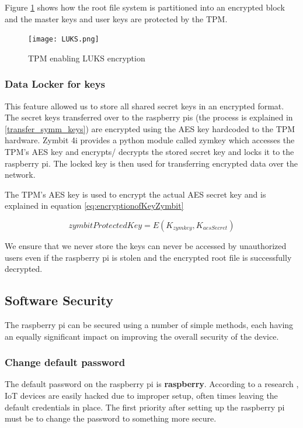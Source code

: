 \documentclass[11pt,openright]{report}
\begin{document}
Figure \ref{fig:tpmenableluks} shows how the root file system is partitioned into an encrypted block and the master keys and user keys are protected by the TPM.
\begin{figure}
	\centering
	\texttt{[image: LUKS.png]}
	\caption{TPM enabling LUKS encryption}
	\label{fig:tpmenableluks}
\end{figure}

\subsubsection{Data Locker for keys}
This feature allowed us to store all shared secret keys in an encrypted format. The secret keys transferred over to the raspberry pis (the process is explained in \ref{transfer_symm_keys}) are encrypted using the AES key hardcoded to the TPM hardware. Zymbit 4i provides a python module called zymkey which accesses the TPM's AES key and encrypts/ decrypts the stored secret key and locks it to the raspberry pi. The locked key is then used for transferring encrypted data over the network.

The TPM's AES key is used to encrypt the actual AES secret key and is explained in equation \ref{eq:encryptionofKeyZymbit}

\begin{equation} \label{eq:encryptionofKeyZymbit}
    zymbitProtectedKey =  E(K_{zymkey}, K_{aesSecret})
\end{equation}

We ensure that we never store the keys can never be accessed by unauthorized users even if the raspberry pi is stolen and the encrypted root file is successfully decrypted.

\subsection{Software Security}
The raspberry pi can be secured using a number of simple methods, each having an equally significant impact on improving the overall security of the device.

\subsubsection{Change default password}
The default password on the raspberry pi is \textbf{raspberry}. According to a research \cite{8364059}, IoT devices are easily hacked due to improper setup, often times leaving the default credentials in place. The first priority after setting up the raspberry pi must be to change the password to something more secure.
\end{document}
